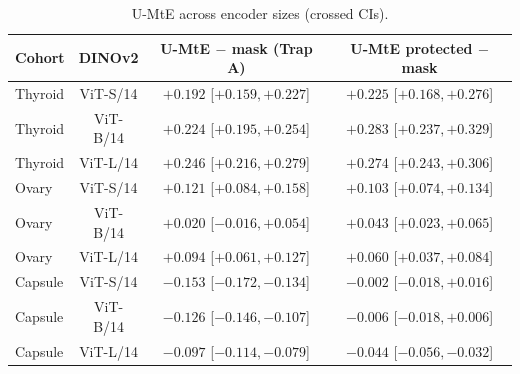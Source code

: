 \begin{table}[H]\centering\scriptsize
\caption{U-MtE across encoder sizes (crossed CIs).}\label{tab:scalerem}
\begin{tabular}{lccc}\toprule
Cohort & DINOv2 & U-MtE $-$ mask (Trap A) & U-MtE protected $-$ mask \\\midrule
Thyroid & ViT-S/14 & $+0.192$ [$+0.159, +0.227$] & $+0.225$ [$+0.168, +0.276$] \\
Thyroid & ViT-B/14 & $+0.224$ [$+0.195, +0.254$] & $+0.283$ [$+0.237, +0.329$] \\
Thyroid & ViT-L/14 & $+0.246$ [$+0.216, +0.279$] & $+0.274$ [$+0.243, +0.306$] \\
Ovary & ViT-S/14 & $+0.121$ [$+0.084, +0.158$] & $+0.103$ [$+0.074, +0.134$] \\
Ovary & ViT-B/14 & $+0.020$ [$-0.016, +0.054$] & $+0.043$ [$+0.023, +0.065$] \\
Ovary & ViT-L/14 & $+0.094$ [$+0.061, +0.127$] & $+0.060$ [$+0.037, +0.084$] \\
Capsule & ViT-S/14 & $-0.153$ [$-0.172, -0.134$] & $-0.002$ [$-0.018, +0.016$] \\
Capsule & ViT-B/14 & $-0.126$ [$-0.146, -0.107$] & $-0.006$ [$-0.018, +0.006$] \\
Capsule & ViT-L/14 & $-0.097$ [$-0.114, -0.079$] & $-0.044$ [$-0.056, -0.032$] \\
\bottomrule\end{tabular}
\end{table}
